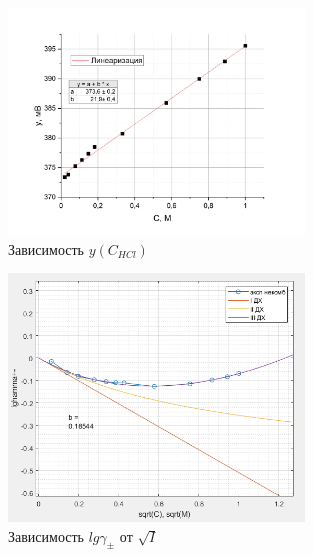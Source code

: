 \documentclass[a4paper, 12pt]{article}
\begin{document}
\begin{figure}[h!]
    \begin{center}
    \includegraphics[width=0.7\textwidth]{3.3.png}
    \end{center}
    \caption{Зависимость $y(C_{HCl})$}
\end{figure}
\begin{figure}[h!]
    \begin{center}
    \includegraphics[width=0.7\textwidth]{3_5_I_II_III.png}
    \end{center}
    \caption{Зависимость $lg \gamma _{\pm}$ от $\sqrt{I}$}
\end{figure}
\end{document}
